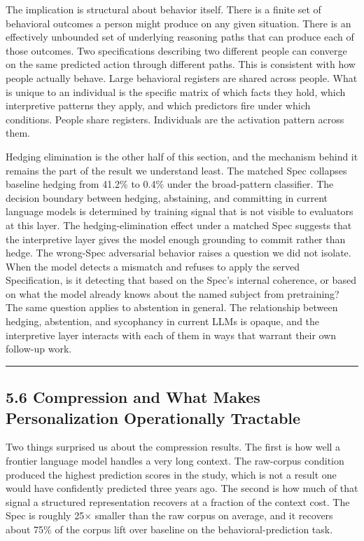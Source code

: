 The implication is structural about behavior itself. There is a finite
set of behavioral outcomes a person might produce on any given
situation. There is an effectively unbounded set of underlying reasoning
paths that can produce each of those outcomes. Two specifications
describing two different people can converge on the same predicted
action through different paths. This is consistent with how people
actually behave. Large behavioral registers are shared across people.
What is unique to an individual is the specific matrix of which facts
they hold, which interpretive patterns they apply, and which predictors
fire under which conditions. People share registers. Individuals are the
activation pattern across them.

Hedging elimination is the other half of this section, and the mechanism
behind it remains the part of the result we understand least. The
matched Spec collapses baseline hedging from 41.2\% to 0.4\% under the
broad-pattern classifier. The decision boundary between hedging,
abstaining, and committing in current language models is determined by
training signal that is not visible to evaluators at this layer. The
hedging-elimination effect under a matched Spec suggests that the
interpretive layer gives the model enough grounding to commit rather
than hedge. The wrong-Spec adversarial behavior raises a question we did
not isolate. When the model detects a mismatch and refuses to apply the
served Specification, is it detecting that based on the Spec's internal
coherence, or based on what the model already knows about the named
subject from pretraining? The same question applies to abstention in
general. The relationship between hedging, abstention, and sycophancy in
current LLMs is opaque, and the interpretive layer interacts with each
of them in ways that warrant their own follow-up work.

\begin{center}\rule{0.5\linewidth}{0.5pt}\end{center}

\hypertarget{compression-and-what-makes-personalization-operationally-tractable}{%
\subsection{5.6 Compression and What Makes Personalization Operationally
Tractable}\label{compression-and-what-makes-personalization-operationally-tractable}}

Two things surprised us about the compression results. The first is how
well a frontier language model handles a very long context. The
raw-corpus condition produced the highest prediction scores in the
study, which is not a result one would have confidently predicted three
years ago. The second is how much of that signal a structured
representation recovers at a fraction of the context cost. The Spec is
roughly 25× smaller than the raw corpus on average, and it recovers
about 75\% of the corpus lift over baseline on the behavioral-prediction
task.

